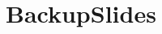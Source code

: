 \documentclass[17pt, t, lualatex]{beamer}
\begin{document}










\section*{BackupSlides}\insertsectionpage
\end{document}
